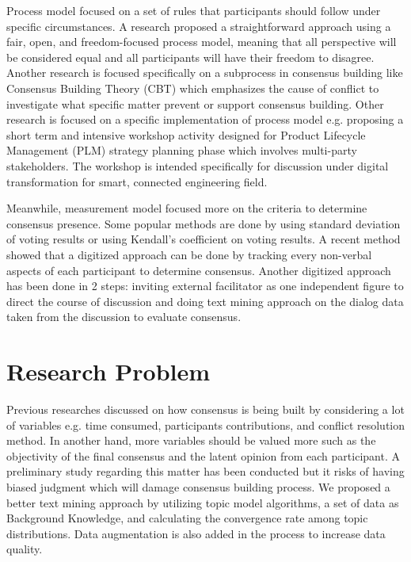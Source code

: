 \documentclass[10pt, conference, compsocconf]{IEEEtran}
\begin{document}
Process model focused on a set of rules that participants should follow under specific circumstances. A research proposed a straightforward approach using a fair, open, and freedom-focused process model\cite{b20}, meaning that all perspective will be considered equal and all participants will have their freedom to disagree. Another research is focused specifically on a subprocess in consensus building like Consensus Building Theory (CBT)\cite{b21} which emphasizes the cause of conflict to investigate what specific matter prevent or support consensus building. Other research is focused on a specific implementation of process model\cite{b3} e.g. proposing a short term and intensive workshop activity designed for Product Lifecycle Management (PLM) strategy planning phase which involves multi-party stakeholders. The workshop is intended specifically for discussion under digital transformation for smart, connected engineering field.

Meanwhile, measurement model focused more on the criteria to determine consensus presence. Some popular methods are done by using standard deviation of voting results or using Kendall's coefficient on voting results\cite{b22}. A recent method showed that a digitized approach can be done by tracking every non-verbal aspects of each participant to determine consensus\cite{b5}. Another digitized approach has been done in 2 steps: inviting external facilitator as one independent figure to direct the course of discussion and doing text mining approach on the dialog data taken from the discussion to evaluate consensus\cite{b4}.   

\section{Research Problem}
\label{sec_rp}
Previous researches discussed on how consensus is being built by considering  a lot of variables e.g. time consumed, participants contributions, and conflict resolution method. In another hand, more variables should be valued more such as the objectivity of the final consensus and the latent opinion from each participant. A preliminary study regarding this matter has been conducted\cite{b4} but it risks of having biased judgment which will damage consensus building process. We proposed a better text mining approach by utilizing topic model algorithms, a set of data as Background Knowledge, and calculating the convergence rate among topic distributions. Data augmentation is also added in the process to increase data quality.
\end{document}
